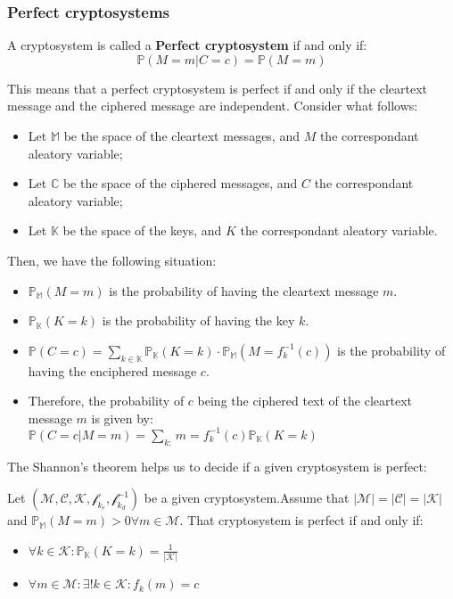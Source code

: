 \subsubsection{Perfect cryptosystems}
\begin{definition}
    A cryptosystem is called a \textbf{Perfect cryptosystem} if and only if:
    \[\mathbb{P}(M = m|C = c) = \mathbb{P}(M = m)\]
\end{definition}
This means that a perfect cryptosystem is perfect if and only if the cleartext message and the ciphered message are independent.\newline
Consider what follows:
\begin{itemize}
    \item Let $\mathbb{M}$ be the space of the cleartext messages, and $M$ the correspondant aleatory variable;
    \item Let $\mathbb{C}$ be the space of the ciphered messages, and $C$ the correspondant aleatory variable;
    \item Let $\mathbb{K}$ be the space of the keys, and $K$ the correspondant aleatory variable.
\end{itemize}
Then, we have the following situation:
\begin{itemize}
    \item $\mathbb{P}_{\mathbb{M}}(M = m)$ is the probability of having the cleartext message $m$.
    \item $\mathbb{P}_{\mathbb{K}}(K = k)$ is the probability of having the key $k$.
    \item $\mathbb{P}(C = c) = \sum_{k \in \mathbb{K}} \mathbb{P}_{\mathbb{K}}(K = k) \cdot \mathbb{P}_{\mathbb{M}}(M = f_{k}^{-1}(c))$ is the probability of having the enciphered message $c$.
    \item Therefore, the probability of $c$ being the ciphered text of the cleartext message $m$ is given by:\\
    $\mathbb{P}(C = c|M = m) = \sum_{k : } m = f_{k}^{-1}(c) \mathbb{P}_{\mathbb{K}}(K = k)$
\end{itemize}
The Shannon's theorem helps us to decide if a given cryptosystem is perfect:
\begin{theorem}
    Let $(\mathcal{M},\mathcal{C}, \mathcal{K}, \mathscr{f}_{k_{e}},\mathscr{f}_{k_{d}}^{-1})$ be a given cryptosystem.\newline Assume that $|\mathcal{M}| = |\mathcal{C}| = |\mathcal{K}|$ and $\mathbb{P}_{\mathbb{M}}(M = m) > 0 \forall m \in \mathcal{M}$. \newline
    That cryptosystem is perfect if and only if:
    \begin{itemize}
        \item $\forall k \in \mathcal{K}: \mathbb{P}_{\mathbb{K}}(K = k) = \frac{1}{|\mathcal{K}|}$
        \item $\forall m \in \mathcal{M}: \exists ! k \in \mathcal{K}: f_{k}(m) = c$
    \end{itemize}
\end{theorem}
